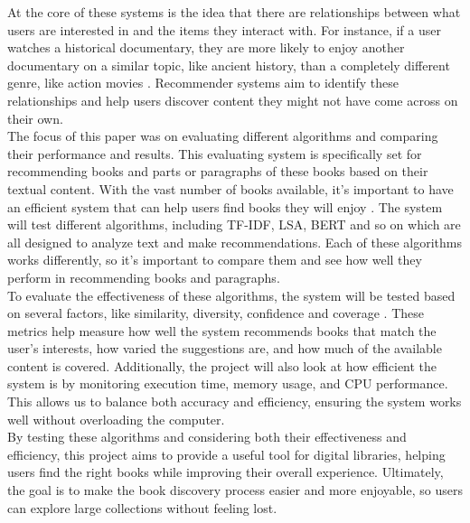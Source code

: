 \documentclass[10pt, oneside,english,hidelinks,a4paper]{article}
\begin{document}
\begin{multicols}{2}
%
At the core of these systems is the idea that there are relationships between what users are interested in and the items they interact with. For instance, if a user watches a historical documentary, they are more likely to enjoy another documentary on a similar topic, like ancient history, than a completely different genre, like action movies \cite{pub.1022525812}. Recommender systems aim to identify these relationships and help users discover content they might not have come across on their own.\\
%
The focus of this paper was on evaluating different algorithms and comparing their performance and results. This evaluating system is specifically set for recommending books and parts or paragraphs of these books based on their textual content. With the vast number of books available, it’s important to have an efficient system that can help users find books they will enjoy \cite{Zangerle2023}. The system will test different algorithms, including TF-IDF, LSA, BERT and so on which are all designed to analyze text and make recommendations. Each of these algorithms works differently, so it’s important to compare them and see how well they perform in recommending books and paragraphs.\\
%
To evaluate the effectiveness of these algorithms, the system will be tested based on several factors, like similarity, diversity, confidence and coverage \cite{Gunawardana2022547}. These metrics help measure how well the system recommends books that match the user’s interests, how varied the suggestions are, and how much of the available content is covered. Additionally, the project will also look at how efficient the system is by monitoring execution time, memory usage, and CPU performance. This allows us to balance both accuracy and efficiency, ensuring the system works well without overloading the computer. \\
By testing these algorithms and considering both their effectiveness and efficiency, this project aims to provide a useful tool for digital libraries, helping users find the right books while improving their overall experience. Ultimately, the goal is to make the book discovery process easier and more enjoyable, so users can explore large collections without feeling lost.\\





\end{multicols}
\end{document}
